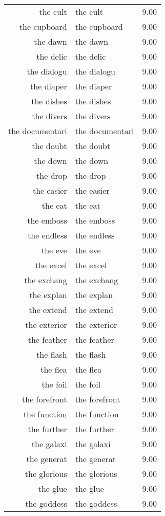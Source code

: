 \begin{table}[ht]
\begin{tabular}{rlr}
  the cult & the cult & 9.00 \\ 
  the cupboard & the cupboard & 9.00 \\ 
  the dawn & the dawn & 9.00 \\ 
  the delic & the delic & 9.00 \\ 
  the dialogu & the dialogu & 9.00 \\ 
  the diaper & the diaper & 9.00 \\ 
  the dishes & the dishes & 9.00 \\ 
  the divers & the divers & 9.00 \\ 
  the documentari & the documentari & 9.00 \\ 
  the doubt & the doubt & 9.00 \\ 
  the down & the down & 9.00 \\ 
  the drop & the drop & 9.00 \\ 
  the easier & the easier & 9.00 \\ 
  the eat & the eat & 9.00 \\ 
  the emboss & the emboss & 9.00 \\ 
  the endless & the endless & 9.00 \\ 
  the eve & the eve & 9.00 \\ 
  the excel & the excel & 9.00 \\ 
  the exchang & the exchang & 9.00 \\ 
  the explan & the explan & 9.00 \\ 
  the extend & the extend & 9.00 \\ 
  the exterior & the exterior & 9.00 \\ 
  the feather & the feather & 9.00 \\ 
  the flash & the flash & 9.00 \\ 
  the flea & the flea & 9.00 \\ 
  the foil & the foil & 9.00 \\ 
  the forefront & the forefront & 9.00 \\ 
  the function & the function & 9.00 \\ 
  the further & the further & 9.00 \\ 
  the galaxi & the galaxi & 9.00 \\ 
  the generat & the generat & 9.00 \\ 
  the glorious & the glorious & 9.00 \\ 
  the glue & the glue & 9.00 \\ 
  the goddess & the goddess & 9.00 \\ 

\end{tabular}
\end{table}
